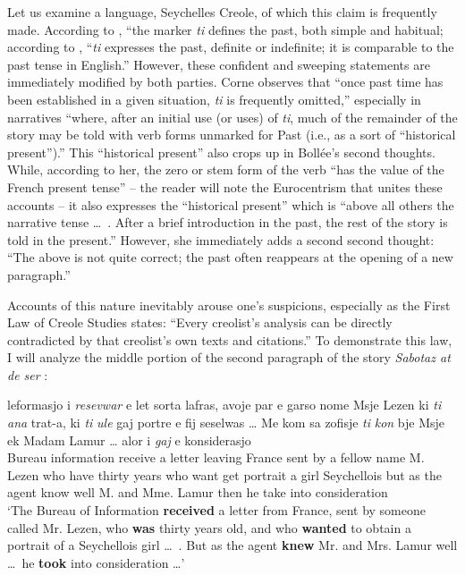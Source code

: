 Let us examine a language, Seychelles Creole, of which this claim is frequently made. According to \citet[102]{Corne1977}, ``the marker \textit{ti} defines the past, both simple and habitual{\textquotedbl}; according to \citet[55]{Bollee1977}, ``\textit{ti} expresses the past, definite or indefinite; it is comparable to the past tense in English.'' However, these confident and sweeping statements are immediately modified by both parties. Corne observes that ``once past time has been established in a given situation, \textit{ti} is frequently omitted,'' especially in narratives ``where, after an initial use (or uses) of \textit{ti}, much of the remainder of the story may be told with verb forms unmarked for Past (i.e., as a sort of ``historical present'').'' This ``historical present'' also crops up in Bollée's second thoughts. While, according to her, the zero or stem form of the verb ``has the value of the French present tense'' -- the reader will note the Euro\-centrism that unites these accounts -- it also expresses the ``historical present'' which is ``above all others the narrative tense \ldots~. After a brief introduction in the past, the rest of the story is told in the pres\-ent.'' However, she immediately adds a second second thought: ``The above is not quite correct; the past often reappears at the opening of a new paragraph.''

Accounts of this nature inevitably arouse one's suspicions, especially as the First Law of Creole Studies states: ``Every creolist's analysis can be directly contradicted by that creolist's own texts and citations.'' To demonstrate this law, I will analyze the middle portion of the second paragraph of the story \textit{Sabotaz at de ser} \citep[166]{Bollee1977}:

\ea\label{ex:2:94}
 {leformasjo} {i} \emph{resevwar} {e} {let} {sorta} {lafras,} {avoje} {par} {e} {garso} {nome} {M}{sje} {Lezen} {ki} \emph{ti} \emph{ana} {trat-a,} {ki} \emph{ti} \emph{ule} {gaj} {portre} {e} {fij} {seselwas} {\ldots } {Me} {kom} {sa} {zofisje} \emph{ti} \emph{kon} {b}{je} {Msje} {ek} {M}{adam} {Lamur} {\ldots} {alor} i \emph{gaj} {e} {konsiderasjo} \\
Bureau information {\PM} receive a letter leaving France sent by a fellow name M. Lezen who {\TNS} have {thirty years} who {\TNS} want get portrait a girl Seychellois { } but as the agent {\TNS} know well M. and Mme. Lamur { } then he take into consideration\\
\glt `The Bureau of Information \textbf{received} a letter from France, sent by someone called Mr. Lezen, who \textbf{was} thirty years old, and who \textbf{wanted} to obtain a portrait of a Seychellois girl \ldots~. But as the agent \textbf{knew} Mr. and Mrs. Lamur well \ldots~he \textbf{took} into consideration \ldots '
\z


